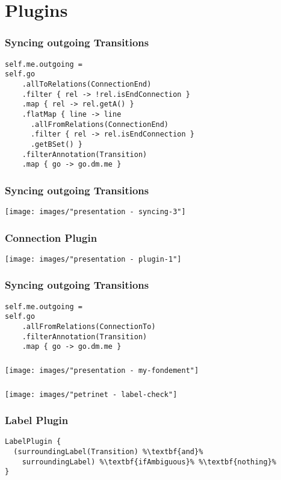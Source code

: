\section{Plugins}
\begin{frame}[fragile]
  \frametitle{Syncing outgoing Transitions}
  \vspace*{-1cm}
  \begin{lstlisting}
self.me.outgoing = 
self.go
    .allToRelations(ConnectionEnd)
    .filter { rel -> !rel.isEndConnection }
    .map { rel -> rel.getA() }
    .flatMap { line -> line
      .allFromRelations(ConnectionEnd)
      .filter { rel -> rel.isEndConnection }
      .getBSet() }
    .filterAnnotation(Transition)
    .map { go -> go.dm.me }
  \end{lstlisting}
\end{frame}

\begin{frame}
  \frametitle{Syncing outgoing Transitions}
  \hspace{-1cm}
  \texttt{[image: images/"presentation - syncing-3"]}
\end{frame}

\begin{frame}
  \centering
  \hspace{-1cm}
  \huge
\end{frame}

\begin{frame}
  \frametitle{Connection Plugin}
  \hspace{-1cm}
  \texttt{[image: images/"presentation - plugin-1"]}
\end{frame}

\begin{frame}[fragile]
  \frametitle{Syncing outgoing Transitions}
\vspace*{-1cm}
  \begin{lstlisting}
self.me.outgoing = 
self.go
    .allFromRelations(ConnectionTo)
    .filterAnnotation(Transition)
    .map { go -> go.dm.me }
  \end{lstlisting}
\end{frame}

\begin{frame}
  \frametitle{}
  \hspace{-1cm}
  \texttt{[image: images/"presentation - my-fondement"]}
\end{frame}


\begin{frame}
  \frametitle{}
  \centering
  \hspace{-1cm}
  \texttt{[image: images/"petrinet - label-check"]}
\end{frame}

\begin{frame}[fragile]
  \frametitle{Label Plugin}
  \vspace*{-1cm}
  \begin{lstlisting}[escapechar=\%]
LabelPlugin {
  (surroundingLabel(Transition) %\textbf{and}%
    surroundingLabel) %\textbf{ifAmbiguous}% %\textbf{nothing}%
}
  \end{lstlisting}  
\end{frame}
